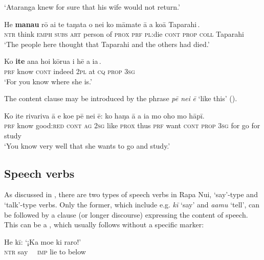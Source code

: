 \glt 
‘Ataranga knew for sure that his wife would not return.’ \textstyleExampleref{[R532-01.019]}
\z

\ea\label{ex:11.63}
\gll He \textbf{mana{\ꞌ}u} rō {\ꞌ}ai te taŋata o nei {\ob}ko māmate {\ꞌ}ā a koā Taparahi\,{\cb}.\\
\textsc{ntr} think \textsc{emph} \textsc{subs} \textsc{art} person of \textsc{prox} {\db}\textsc{prf} \textsc{pl}:die \textsc{cont} \textsc{prop} \textsc{coll} Taparahi\\

\glt 
‘The people here thought that Taparahi and the others had died.’ \textstyleExampleref{[R250.243]} 
\z

\ea\label{ex:11.64}
\gll Ko \textbf{{\ꞌ}ite} {\ꞌ}ana ho{\ꞌ}i kōrua {\ob}{\ꞌ}i hē a ia\,{\cb}.\\
\textsc{prf} know \textsc{cont} indeed \textsc{2pl} {\db}at \textsc{cq} \textsc{prop} \textsc{3sg}\\

\glt
‘For you know where she is.’ \textstyleExampleref{[R229.277]} 
\z

The content clause may be introduced by the phrase \textit{pē nei} \textit{ē} ‘like this’ ().

\ea\label{ex:11.65}
\gll Ko {\ꞌ}ite rivariva {\ꞌ}ā e koe pē nei ē: ko haŋa {\ꞌ}ā a ia  mo oho mo hāpī.\\
\textsc{prf} know good:\textsc{red} \textsc{cont} \textsc{ag} \textsc{2sg} like \textsc{prox} thus \textsc{prf} want \textsc{cont} \textsc{prop} \textsc{3sg}  for go for study\\

\glt 
‘You know very well that she wants to go and study.’ \textstyleExampleref{[R210.066]} 
\z
{}
\subsection{Speech verbs}\label{sec:11.3.4}
As discussed in , there are two types of speech verbs in Rapa Nui, ‘say’-type and ‘talk’-type verbs. Only the former, which include e.g. \textit{kī} ‘say’ and \textit{\mbox{{\ꞌ}a{\ꞌ}amu}} ‘tell’, can be followed by a clause (or longer discourse) expressing the content of speech. This can be a , which usually follows without a specific marker:

\ea\label{ex:11.66}
\gll He kī: ‘¡Ka moe ki raro!’\\
\textsc{ntr} say ~~\textsc{imp} lie to below\\


